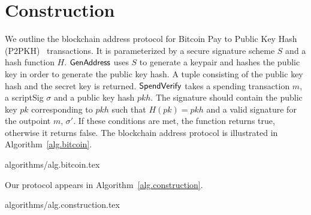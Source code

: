 \section{Construction}\label{section:construction}

We outline the blockchain address protocol for Bitcoin Pay to Public Key Hash (P2PKH)~\cite{bitcoin-dev-guide} transactions. It is parameterized by a secure signature scheme $S$ and a hash function $H$.
$\mathsf{GenAddress}$ uses $S$ to generate a keypair and hashes the public key in order to generate the public key hash. A tuple consisting of the public key hash and the secret key is returned.
$\mathsf{SpendVerify}$ takes a spending transaction $m$, a scriptSig $\sigma$ and a public key hash $pkh$. The signature should contain the public key $pk$ corresponding to $pkh$ such that $H(pk) = pkh$ and a valid signature for the outpoint $m$, $\sigma'$. If these conditions are met, the function returns true, otherwise it returns false.
The blockchain address protocol is illustrated in Algorithm~\ref{alg.bitcoin}.

{algorithms/alg.bitcoin.tex}

Our protocol appears in Algorithm~\ref{alg.construction}.

{algorithms/alg.construction.tex}
